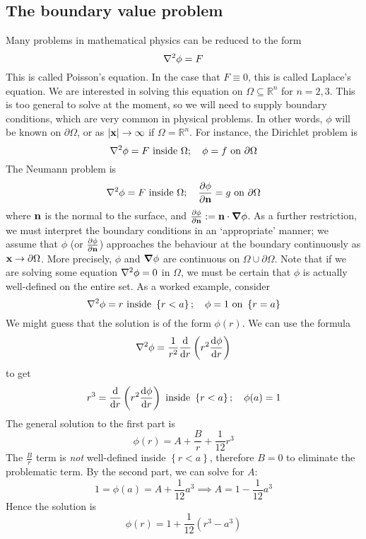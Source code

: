 \subsection{The boundary value problem}
Many problems in mathematical physics can be reduced to the form
\[
	\laplacian{\phi} = F
\]
This is called Poisson's equation.
In the case that \(F \equiv 0\), this is called Laplace's equation.
We are interested in solving this equation on \(\Omega \subseteq \mathbb R^n\) for \(n = 2, 3\).
This is too general to solve at the moment, so we will need to supply boundary conditions, which are very common in physical problems.
In other words, \(\phi\) will be known on \(\partial \Omega\), or as \(\abs{\vb x} \to \infty\) if \(\Omega = \mathbb R^n\).
For instance, the Dirichlet problem is
\[
	\laplacian{\phi} = F \text{ inside } \Omega;\quad \phi = f \text{ on } \partial \Omega
\]
The Neumann problem is
\[
	\laplacian{\phi} = F \text{ inside } \Omega;\quad \pdv{\phi}{\vb n} = g \text{ on } \partial \Omega
\]
where \(\vb n\) is the normal to the surface, and \(\pdv{\phi}{\vb n} := \vb n \cdot \grad{\phi}\).
As a further restriction, we must interpret the boundary conditions in an `appropriate' manner; we assume that \(\phi\) (or \(\pdv{\phi}{\vb n}\)) approaches the behaviour at the boundary continuously as \(\vb x \to \partial \Omega\).
More precisely, \(\phi\) and \(\grad{\phi}\) are continuous on \(\Omega \cup \partial\Omega\).
Note that if we are solving some equation \(\laplacian{\phi} = 0\) in \(\Omega\), we must be certain that \(\phi\) is actually well-defined on the entire set.
As a worked example, consider
\[
	\laplacian{\phi} = r \text{ inside } \left\{ r < a \right\};\quad \phi = 1 \text{ on } \left\{ r = a \right\}
\]
We might guess that the solution is of the form \(\phi(r)\).
We can use the formula
\[
	\laplacian{\phi} = \frac{1}{r^2} \dv{r}\left( r^2 \dv{\phi}{r} \right)
\]
to get
\[
	r^3 = \dv{r}\left( r^2 \dv{\phi}{r} \right) \text{ inside } \left\{ r < a \right\};\quad \phi(a) = 1
\]
The general solution to the first part is
\[
	\phi(r) = A + \frac{B}{r} + \frac{1}{12}r^3
\]
The \(\frac{B}{r}\) term is \textit{not} well-defined inside \(\left\{ r < a \right\}\), therefore \(B=0\) to eliminate the problematic term.
By the second part, we can solve for \(A\):
\[
	1 = \phi(a) = A + \frac{1}{12}a^3 \implies A = 1 - \frac{1}{12}a^3
\]
Hence the solution is
\[
	\phi(r) = 1 + \frac{1}{12}\left(r^3 - a^3\right)
\]

